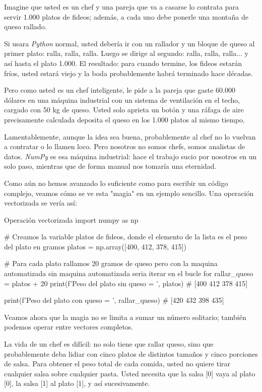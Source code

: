 \begin{ejemplo}
    Imagine que usted es un chef y una pareja que va a casarse lo contrata para servir 1.000 platos de fideos; además, a cada uno debe ponerle una montaña de queso rallado.

    Si usara \textit{Python} normal, usted debería ir con un rallador y un bloque de queso al primer plato: ralla, ralla, ralla. Luego se dirige al segundo: ralla, ralla, ralla... y así hasta el plato 1.000. El resultado: para cuando termine, los fideos estarán fríos, usted estará viejo y la boda probablemente habrá terminado hace décadas.

    Pero como usted es un chef inteligente, le pide a la pareja que gaste 60.000 dólares en una máquina industrial con un sistema de ventilación en el techo, cargado con 50 kg de queso. Usted solo aprieta un botón y una ráfaga de aire precisamente calculada deposita el queso en los 1.000 platos al mismo tiempo.

    Lamentablemente, aunque la idea sea buena, probablemente al chef no lo vuelvan a contratar o lo llamen loco. Pero nosotros no somos chefs, somos analistas de datos. \textit{NumPy} es esa máquina industrial: hace el trabajo sucio por nosotros en un solo paso, mientras que de forma manual nos tomaría una eternidad.
\end{ejemplo}

Como aún no hemos avanzado lo suficiente como para escribir un código complejo, veamos cómo se ve esta "magia" en un ejemplo sencillo. Una operación vectorizada se vería así:

\begin{pycode}{Operación vectorizada}
    import numpy as np

    # Creamos la variable platos de fideos, donde el elemento de la lista es el peso del plato en gramos
    platos = np.array([400, 412, 378, 415])

    # Para cada plato rallamos 20 gramos de queso pero con la maquina automatizada sin maquina automatizada seria iterar en el bucle for
    rallar_queso = platos + 20
    print(f'Peso del plato sin queso = ', platos) # [400 412 378 415]

    print(f'Peso del plato con queso = ', rallar_queso) # [420 432 398 435]
\end{pycode}

Veamos ahora que la magia no se limita a sumar un número solitario; también podemos operar entre vectores completos.

\begin{ejemplo}
    La vida de un chef es difícil: no solo tiene que rallar queso, sino que probablemente deba lidiar con cinco platos de distintos tamaños y cinco porciones de salsa. Para obtener el peso total de cada comida, usted no quiere tirar cualquier salsa sobre cualquier pasta. Usted necesita que la salsa [0] vaya al plato [0], la salsa [1] al plato [1], y así sucesivamente.
\end{ejemplo}

